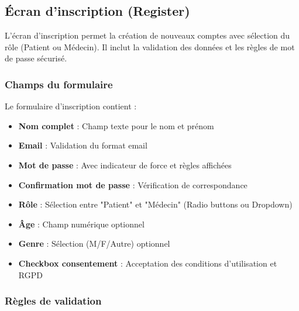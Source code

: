 \documentclass[a4paper,11pt]{report}
\begin{document}
\subsection{Écran d'inscription (Register)}

L'écran d'inscription permet la création de nouveaux comptes avec sélection du rôle (Patient ou Médecin). Il inclut la validation des données et les règles de mot de passe sécurisé.

\subsubsection{Champs du formulaire}

Le formulaire d'inscription contient :
\begin{itemize}
    \item \textbf{Nom complet} : Champ texte pour le nom et prénom
    \item \textbf{Email} : Validation du format email
    \item \textbf{Mot de passe} : Avec indicateur de force et règles affichées
    \item \textbf{Confirmation mot de passe} : Vérification de correspondance
    \item \textbf{Rôle} : Sélection entre "Patient" et "Médecin" (Radio buttons ou Dropdown)
    \item \textbf{Âge} : Champ numérique optionnel
    \item \textbf{Genre} : Sélection (M/F/Autre) optionnel
    \item \textbf{Checkbox consentement} : Acceptation des conditions d'utilisation et RGPD
\end{itemize}

\subsubsection{Règles de validation}
\end{document}

